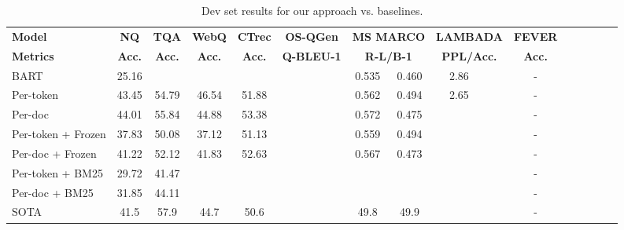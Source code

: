 \begin{table*}[t]
\footnotesize

\centering %
\fontsize{8.4}{10.1}\selectfont
\setlength{\tabcolsep}{0.3em}


\begin{tabular}{lcccccc@{/}cc@{/}ccccc@{/}cc}

\toprule

\textbf{Model} & \multicolumn{1}{c}{\textbf{NQ}} & \multicolumn{1}{c}{\textbf{TQA}} & \multicolumn{1}{c}{\textbf{WebQ}} & \multicolumn{1}{c}{\textbf{CTrec}} & \multicolumn{1}{c}{\textbf{OS-QGen}} & \multicolumn{2}{c}{\textbf{MS MARCO}} & \multicolumn{2}{c}{\textbf{LAMBADA}} & \multicolumn{1}{c}{\textbf{FEVER}}\\
\textbf{Metrics} & \multicolumn{1}{c}{\textbf{Acc.}} & \multicolumn{1}{c}{\textbf{Acc.}} & \multicolumn{1}{c}{\textbf{Acc.}} & \multicolumn{1}{c}{\textbf{Acc.}} & \multicolumn{1}{c}{\textbf{Q-BLEU-1}} & \multicolumn{2}{c}{\textbf{R-L/B-1}} & \multicolumn{2}{c}{\textbf{PPL/Acc.}} & \multicolumn{1}{c}{\textbf{Acc.}}\\
\midrule
BART & 25.16 &  &  &  &  & 0.535 & 0.460 & 2.86 &  & - \\
\midrule
Per-token & 43.45 & 54.79 & 46.54 & 51.88 & & 0.562 & 0.494 & 2.65 &  & - \\
Per-doc & 44.01 & 55.84 & 44.88 & 53.38 &  & 0.572 & 0.475 &  &  & - \\
Per-token + Frozen & 37.83 & 50.08 & 37.12 & 51.13 & & 0.559 & 0.494 &  &  & - \\
Per-doc + Frozen & 41.22 & 52.12 & 41.83 & 52.63 &  & 0.567 & 0.473 &  &  & - \\
Per-token + BM25 & 29.72 & 41.47 &  &  &  &  &  &  &  & - \\
Per-doc + BM25 & 31.85 & 44.11 &  &  &  &  &  &  &  & - \\
\midrule
SOTA & 41.5 & 57.9 & 44.7 & 50.6 &  & 49.8 & 49.9 &  &  & - \\

\bottomrule

\end{tabular}

\caption{Dev set results for our approach vs. baselines.}

\label{tab:benchmark}
\end{table*}
